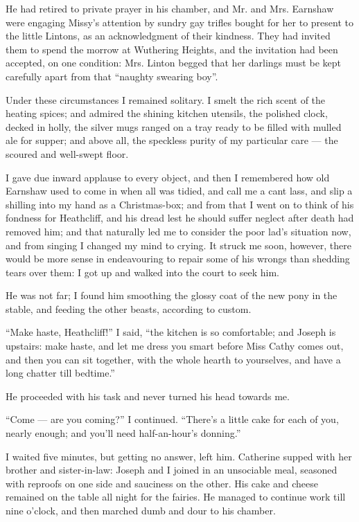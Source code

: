 \par He had retired to private prayer in his chamber, and Mr. and Mrs. Earnshaw were engaging Missy's attention by sundry gay trifles bought for her to present to the little Lintons, as an acknowledgment of their kindness. They had invited them to spend the morrow at Wuthering Heights, and the invitation had been accepted, on one condition: Mrs. Linton begged that her darlings must be kept carefully apart from that “naughty swearing boy”.
\par Under these circumstances I remained solitary. I smelt the rich scent of the heating spices; and admired the shining kitchen utensils, the polished clock, decked in holly, the silver mugs ranged on a tray ready to be filled with mulled ale for supper; and above all, the speckless purity of my particular care — the scoured and well-swept floor.
\par I gave due inward applause to every object, and then I remembered how old Earnshaw used to come in when all was tidied, and call me a cant lass, and slip a shilling into my hand as a Christmas-box; and from that I went on to think of his fondness for Heathcliff, and his dread lest he should suffer neglect after death had removed him; and that naturally led me to consider the poor lad's situation now, and from singing I changed my mind to crying. It struck me soon, however, there would be more sense in endeavouring to repair some of his wrongs than shedding tears over them: I got up and walked into the court to seek him.
\par He was not far; I found him smoothing the glossy coat of the new pony in the stable, and feeding the other beasts, according to custom.
\par “Make haste, Heathcliff!” I said, “the kitchen is so comfortable; and Joseph is upstairs: make haste, and let me dress you smart before Miss Cathy comes out, and then you can sit together, with the whole hearth to yourselves, and have a long chatter till bedtime.”
\par He proceeded with his task and never turned his head towards me.
\par “Come — are you coming?” I continued. “There's a little cake for each of you, nearly enough; and you'll need half-an-hour's donning.”
\par I waited five minutes, but getting no answer, left him. Catherine supped with her brother and sister-in-law: Joseph and I joined in an unsociable meal, seasoned with reproofs on one side and sauciness on the other. His cake and cheese remained on the table all night for the fairies. He managed to continue work till nine o'clock, and then marched dumb and dour to his chamber.
